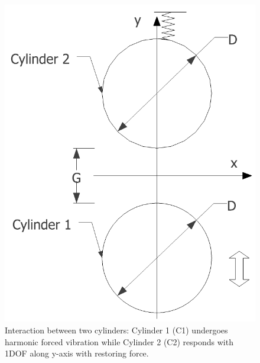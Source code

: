 %
%	


\begin{figure}[tb]		
	\newcommand\widthp{0.5}
	\centering
	\captionsetup{justification=centering}
		\centering
		\includegraphics[width=0.4\linewidth]{Figs/Case_drawing}
	\caption{Interaction between two cylinders: Cylinder 1 (C1) undergoes harmonic forced vibration while Cylinder 2 (C2) responds with 1DOF along y-axis with restoring force. 
	}
		\label{fig:casesetup}
\end{figure}


